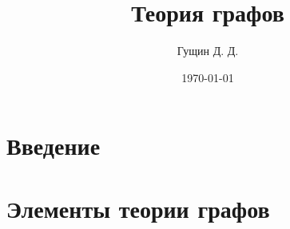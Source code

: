\documentclass[12pt, twoside]{book}
\author{Гущин Д. Д.}
\title{Теория графов}
\date{\today}
\begin{document}
    \maketitle
    \tableofcontents
	
	
	
	\chapter{Введение}
	
	


   \chapter{Элементы теории графов}
	
	
	
	
	
	
	
	
%	
%	
	
%	
%	
%	
%	
	
\end{document}
